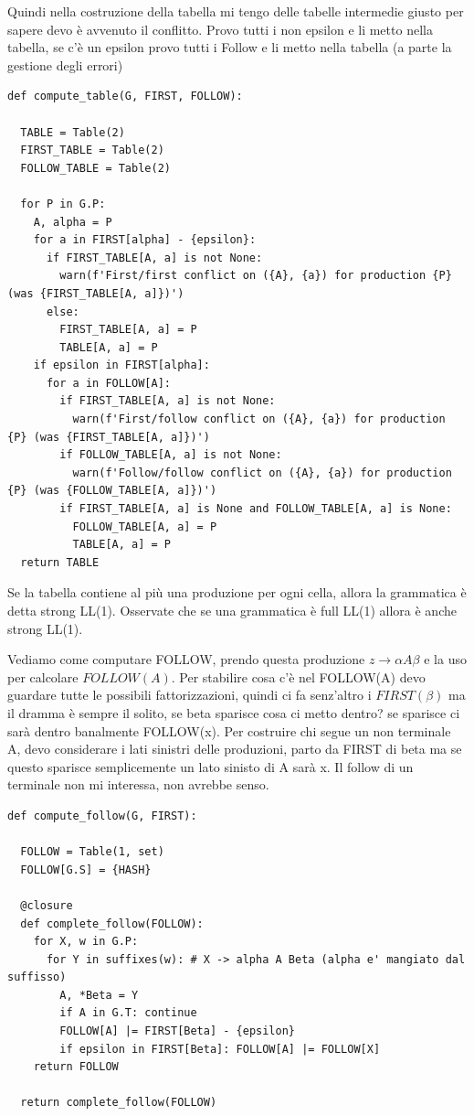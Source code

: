 Quindi nella costruzione della tabella mi tengo delle tabelle intermedie giusto per sapere devo è avvenuto il conflitto.
Provo tutti i non epsilon e li metto nella tabella, se c'è un epsilon provo tutti i Follow e li metto nella tabella (a parte la gestione degli errori)

\begin{lstlisting}
def compute_table(G, FIRST, FOLLOW):

  TABLE = Table(2)
  FIRST_TABLE = Table(2)
  FOLLOW_TABLE = Table(2)

  for P in G.P:
    A, alpha = P
    for a in FIRST[alpha] - {epsilon}:
      if FIRST_TABLE[A, a] is not None:
        warn(f'First/first conflict on ({A}, {a}) for production {P} (was {FIRST_TABLE[A, a]})')
      else:
        FIRST_TABLE[A, a] = P
        TABLE[A, a] = P
    if epsilon in FIRST[alpha]:
      for a in FOLLOW[A]:
        if FIRST_TABLE[A, a] is not None:
          warn(f'First/follow conflict on ({A}, {a}) for production {P} (was {FIRST_TABLE[A, a]})')
        if FOLLOW_TABLE[A, a] is not None:
          warn(f'Follow/follow conflict on ({A}, {a}) for production {P} (was {FOLLOW_TABLE[A, a]})')
        if FIRST_TABLE[A, a] is None and FOLLOW_TABLE[A, a] is None:
          FOLLOW_TABLE[A, a] = P
          TABLE[A, a] = P
  return TABLE
\end{lstlisting}

Se la tabella contiene al più una produzione per ogni cella, allora la grammatica è detta strong LL(1). Osservate che se una grammatica è full LL(1) allora è anche strong LL(1).

Vediamo come computare FOLLOW, prendo questa produzione $z \rightarrow \alpha A \beta$ e la uso per calcolare $FOLLOW(A)$. Per stabilire cosa c'è nel FOLLOW(A) devo guardare tutte le possibili fattorizzazioni, quindi ci fa senz'altro i $FIRST(\beta)$ ma il dramma è sempre il solito, se beta sparisce cosa ci metto dentro? se sparisce ci sarà dentro banalmente FOLLOW(x). Per costruire chi segue un non terminale A, devo considerare i lati sinistri delle produzioni, parto da FIRST di beta ma se questo sparisce semplicemente un lato sinisto di A sarà x.
Il follow di un terminale non mi interessa, non avrebbe senso. 

\begin{lstlisting}
def compute_follow(G, FIRST):

  FOLLOW = Table(1, set)
  FOLLOW[G.S] = {HASH}

  @closure
  def complete_follow(FOLLOW):
    for X, w in G.P:
      for Y in suffixes(w): # X -> alpha A Beta (alpha e' mangiato dal suffisso)
        A, *Beta = Y
        if A in G.T: continue
        FOLLOW[A] |= FIRST[Beta] - {epsilon}
        if epsilon in FIRST[Beta]: FOLLOW[A] |= FOLLOW[X]
    return FOLLOW
  
  return complete_follow(FOLLOW)
\end{lstlisting}


